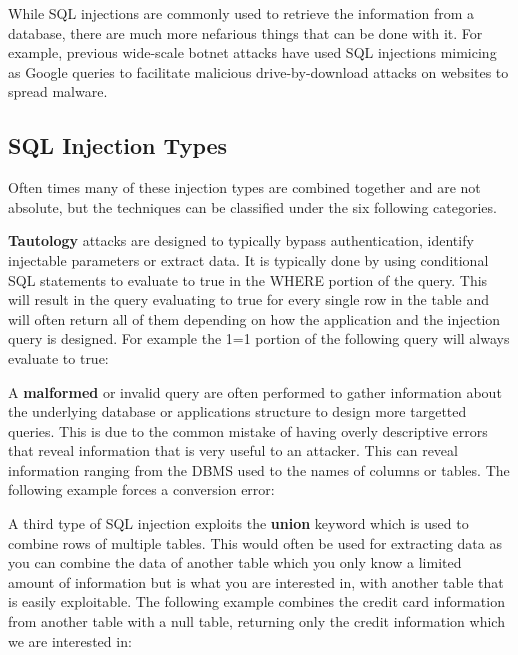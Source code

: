 While SQL injections are commonly used to retrieve the information from a database, there are much more nefarious things that can be done with it.  For example, previous wide-scale botnet attacks have used SQL injections mimicing as Google queries to facilitate malicious drive-by-download attacks on websites to spread malware.  %

\subsection{SQL Injection Types}

Often times many of these injection types are combined together and are not absolute, but the techniques can be classified under the six following categories.

\textbf{Tautology} attacks are designed to typically bypass authentication, identify injectable parameters or extract data.  It is typically done by using conditional SQL statements to evaluate to true in the WHERE portion of the query.  This will result in the query evaluating to true for every single row in the table and will often return all of them depending on how the application and the injection query is designed. For example the 1=1 portion of the following query will always evaluate to true:


A \textbf{malformed} or invalid query are often performed to gather information about the underlying database or applications structure to design more targetted queries.  This is due to the common mistake of having overly descriptive errors that reveal information that is very useful to an attacker. This can reveal information ranging from the DBMS used to the names of columns or tables.  The following example forces a conversion error:


A third type of SQL injection exploits the \textbf{union} keyword which is used to combine rows of multiple tables.  This would often be used for extracting data as you can combine the data of another table which you only know a limited amount of information but is what you are interested in, with another table that is easily exploitable.  The following example combines the credit card information from another table with a null table, returning only the credit information which we are interested in:

